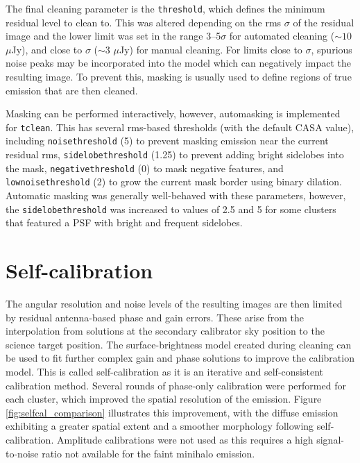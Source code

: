 The final cleaning parameter is the \texttt{threshold}, which defines the minimum residual level to clean to. This was altered depending on the rms $\sigma$ of the residual image and the lower limit was set in the range 3--5$\sigma$ for automated cleaning ($\sim10$ $\mu$Jy), and close to $\sigma$ ($\sim3$ $\mu$Jy) for manual cleaning. For limits close to $\sigma$, spurious noise peaks may be incorporated into the model which can negatively impact the resulting image. To prevent this, masking is usually used to define regions of true emission that are then cleaned. 

Masking can be performed interactively, however, automasking is implemented for \texttt{tclean}. This has several rms-based thresholds (with the default CASA value), including \texttt{noisethreshold} (5) to prevent masking emission near the current residual rms, \texttt{sidelobethreshold} (1.25) to prevent adding bright sidelobes into the mask, \texttt{negativethreshold} (0) to mask negative features, and \texttt{lownoisethreshold} (2) to grow the current mask border using binary dilation. Automatic masking was generally well-behaved with these parameters, however, the \texttt{sidelobethreshold} was increased to values of 2.5 and 5 for some clusters that featured a PSF with bright and frequent sidelobes. 

\section{Self-calibration}
The angular resolution and noise levels of the resulting images are then limited by residual antenna-based phase and gain errors. These arise from the interpolation from solutions at the secondary calibrator sky position to the science target position. The surface-brightness model created during cleaning can be used to fit further complex gain and phase solutions to improve the calibration model. This is called self-calibration as it is an iterative and self-consistent calibration method. Several rounds of phase-only calibration were performed for each cluster, which improved the spatial resolution of the emission. Figure \ref{fig:selfcal_comparison} illustrates this improvement, with the diffuse emission exhibiting a greater spatial extent and a smoother morphology following self-calibration. Amplitude calibrations were not used as this requires a high signal-to-noise ratio not available for the faint minihalo emission.


